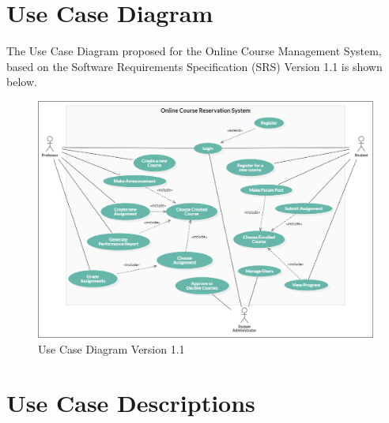 \documentclass[12pt, a4]{report}
\begin{document}
\maketitle
\newpage
\tableofcontents


\newpage
\chapter{Use Case Diagram}
The Use Case Diagram proposed for the Online Course Management System, based on the Software Requirements Specification (SRS) Version 1.1 is shown below.
\begin{figure}[h]
    \begin{center}
        \includegraphics[width=\textwidth]{Diagrams/Use Case Diagram Version 1.1.png}
        \caption{Use Case Diagram Version 1.1}
    \end{center}
\end{figure}


\newpage
\chapter{Use Case Descriptions}

\end{document}
